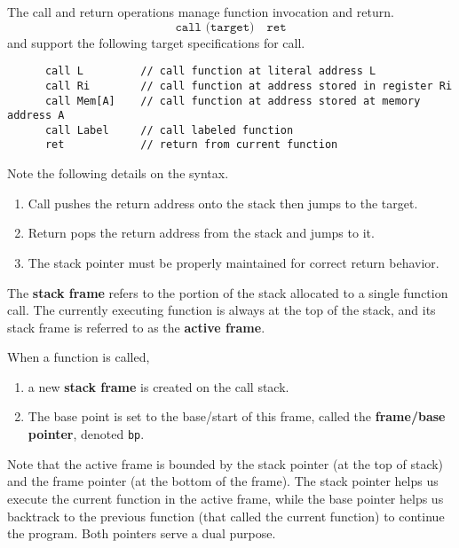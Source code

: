   \begin{definition}
    The call and return operations manage function invocation and return.
    \begin{equation}
      \texttt{call (target)} \quad \texttt{ret}
    \end{equation}
    and support the following target specifications for call.
    \begin{lstlisting}
      call L         // call function at literal address L
      call Ri        // call function at address stored in register Ri
      call Mem[A]    // call function at address stored at memory address A
      call Label     // call labeled function
      ret            // return from current function
    \end{lstlisting}
    Note the following details on the syntax.
    \begin{enumerate}
      \item Call pushes the return address onto the stack then jumps to the target.
      \item Return pops the return address from the stack and jumps to it.
      \item The stack pointer must be properly maintained for correct return behavior.
    \end{enumerate}
  \end{definition}

  \begin{definition}
    The \textbf{stack frame} refers to the portion of the stack allocated to a single function call. The currently executing function is always at the top of the stack, and its stack frame is referred to as the \textbf{active frame}. 
  \end{definition}

  \begin{definition}
    When a function is called, 
    \begin{enumerate}
      \item a new \textbf{stack frame} is created on the call stack. 
      \item The base point is set to the base/start of this frame, called the \textbf{frame/base pointer}, denoted \texttt{bp}. 
    \end{enumerate}
  \end{definition}

  Note that the active frame is bounded by the stack pointer (at the top of stack) and the frame pointer (at the bottom of the frame). The stack pointer helps us execute the current function in the active frame, while the base pointer helps us backtrack to the previous function (that called the current function) to continue the program. Both pointers serve a dual purpose. 

